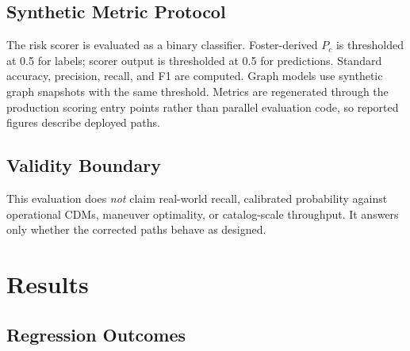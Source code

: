 \documentclass[conference]{IEEEtran}
\newcommand{\Pc}{P_c}
\begin{document}
\subsection{Synthetic Metric Protocol}
The risk scorer is evaluated as a binary classifier. Foster-derived $\Pc$ is
thresholded at 0.5 for labels; scorer output is thresholded at 0.5 for
predictions. Standard accuracy, precision, recall, and F1 are computed. Graph
models use synthetic graph snapshots with the same threshold. Metrics are
regenerated through the production scoring entry points rather than parallel
evaluation code, so reported figures describe deployed paths.

\subsection{Validity Boundary}
This evaluation does \emph{not} claim real-world recall, calibrated probability
against operational CDMs, maneuver optimality, or catalog-scale throughput. It
answers only whether the corrected paths behave as designed.

\section{Results}
\label{sec:results}

\subsection{Regression Outcomes}
\end{document}
